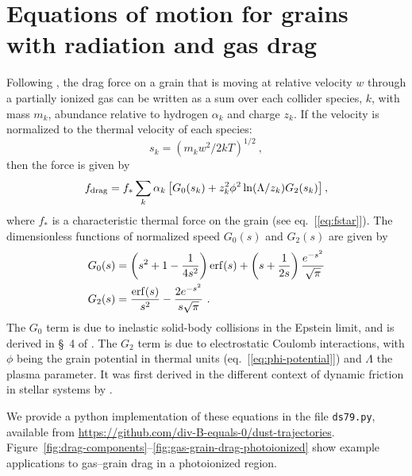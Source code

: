 \section{Equations of motion for grains with radiation and gas drag}
\label{sec:equat-moti-grains}

Following \citet{Draine:1979a}, the drag force on a grain that is
moving at relative velocity \(w\) through a partially ionized gas can
be written as a sum over each collider species, \(k\), with mass
\(m_k\), abundance relative to hydrogen \(\alpha_k\) and charge
\(z_k\). If the velocity is normalized to the thermal velocity of each
species:
\begin{equation}
  \label{eq:s-velocity}
  s_k = \left( m_k w^2 / 2 k T  \right)^{1/2} \ ,
\end{equation}
then the force is given by
\begin{equation}
  \label{eq:ds79}
  f_{\text{drag}} = f_* \sum_k \alpha_k \left[ G_0(s_k) + z_k^2 \phi^2 \ln(\Lambda/z_k) G_2(s_k) \right],
\end{equation}
where \(f_*\) is a characteristic thermal force on the grain
(see eq.~[\ref{eq:fstar}]). The
dimensionless functions of normalized speed \(G_0(s)\) and \(G_2(s)\)
are given by
\begin{align}
  \label{eq:G0}
  G_0(s) & = \left( s^2 + 1 - \frac{1}{4 s^2} \right) \erf(s)
  +  \left( s + \frac{1}{2 s} \right) \frac{e^{-s^2}}{\sqrt{\pi}}\\
  \label{eq:G2}
  G_2(s) & = \frac{\erf(s)}{s^2} - \frac{2 e^{-s^2}}{s \sqrt{\pi}} \ .
\end{align}
The \(G_0\) term is due to inelastic solid-body collisions in the
Epstein limit, and is derived in \S~4 of \citet{Baines:1965a}.  The
\(G_2\) term is due to electrostatic Coulomb interactions, with
\(\phi\) being the grain potential in thermal units
(eq.~[\ref{eq:phi-potential}]) and \(\Lambda\) the plasma parameter.  It was
first derived in the different context of dynamic friction in stellar
systems by \citet{Chandrasekhar:1941a}.

We provide a python implementation of these equations in the file
\texttt{ds79.py}, available from
\url{https://github.com/div-B-equals-0/dust-trajectories}.
Figure~\ref{fig:drag-components}--\ref{fig:gas-grain-drag-photoionized}
show example applications to gas--grain drag in a photoionized region.



